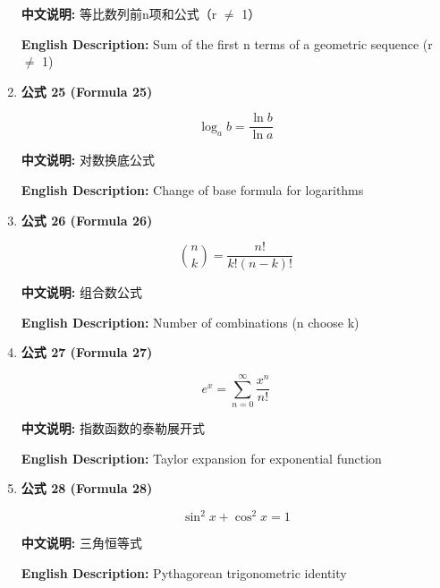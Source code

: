 \documentclass[12pt,a4paper]{article}
\begin{document}
\begin{enumerate}[leftmargin=*]
\textbf{中文说明:} 等比数列前n项和公式（r $\neq$ 1）

\textbf{English Description:} Sum of the first n terms of a geometric sequence (r $\neq$ 1)

\vspace{0.5cm}

\item \textbf{公式 25 (Formula 25)}

\begin{equation}
\log_a{b} = \frac{\ln{b}}{\ln{a}}
\end{equation}

\textbf{中文说明:} 对数换底公式

\textbf{English Description:} Change of base formula for logarithms

\vspace{0.5cm}

\item \textbf{公式 26 (Formula 26)}

\begin{equation}
\binom{n}{k} = \frac{n!}{k!(n-k)!}
\end{equation}

\textbf{中文说明:} 组合数公式

\textbf{English Description:} Number of combinations (n choose k)

\vspace{0.5cm}

\item \textbf{公式 27 (Formula 27)}

\begin{equation}
e^x = \sum_{n=0}^{\infty} \frac{x^n}{n!}
\end{equation}

\textbf{中文说明:} 指数函数的泰勒展开式

\textbf{English Description:} Taylor expansion for exponential function

\vspace{0.5cm}

\item \textbf{公式 28 (Formula 28)}

\begin{equation}
\sin^2 x + \cos^2 x = 1
\end{equation}

\textbf{中文说明:} 三角恒等式

\textbf{English Description:} Pythagorean trigonometric identity

\vspace{0.5cm}


\end{enumerate}
\end{document}
